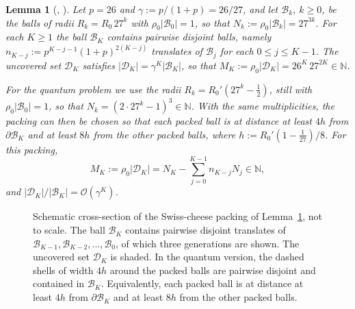 \documentclass[final,reqno]{amsart}
\newtheorem{lemma}[theorem]{Lemma}
\theoremstyle{remark}
\theoremstyle{definition}
\renewcommand{\le}{\leqslant}
\renewcommand{\ge}{\geqslant}
\newcommand{\NN}{\mathbb{N}}
\begin{document}
\begin{lemma}[{\cite[Secs.~III--IV]{lieb1972constitution}}, {\cite[Secs.~3.1 and~5.1]{lieb1975thermodynamic}}]\label{lem:LN_packing}
Let $p=26$ and $\gamma:=p/(1+p)=26/27$, and let $\mathcal B_k$, $k\ge0$, be the balls of radii $R_k=R_0\,27^k$ with $\rho_0|\mathcal B_0|=1$, so that $N_k:=\rho_0|\mathcal B_k|=27^{3k}$. For each $K\ge1$ the ball $\mathcal B_K$ contains pairwise disjoint balls, namely $n_{K-j}:=p^{K-j-1}(1+p)^{2(K-j)}$ translates of $\mathcal B_j$ for each $0\le j\le K-1$. The uncovered set $\mathcal D_K$ satisfies $|\mathcal D_K|=\gamma^K|\mathcal B_K|$, so that $M_K:=\rho_0|\mathcal D_K|=26^K\,27^{2K}\in\NN$.

For the quantum problem we use the radii $R_k=R_0'(27^k-\frac12)$, still with $\rho_0|\mathcal B_0|=1$, so that $N_k=(2\cdot27^k-1)^3\in\NN$. With the same multiplicities, the packing can then be chosen so that each packed ball is at distance at least $4h$ from $\partial \mathcal B_K$ and at least $8h$ from the other packed balls, where $h:=R_0'(1-\frac1{27})/8$. For this packing,
\[
M_K:=\rho_0|\mathcal D_K|=N_K-\sum_{j=0}^{K-1}n_{K-j}N_j\in\NN,
\]
and $|\mathcal D_K|/|\mathcal B_K|=\mathcal O(\gamma^K)$.
\end{lemma}

\begin{figure}[ht]
\centering
{}
\caption{Schematic cross-section of the Swiss-cheese packing of Lemma~\ref{lem:LN_packing}, not to scale. The ball $\mathcal B_K$ contains pairwise disjoint translates of $\mathcal B_{K-1},\mathcal B_{K-2},\dots,\mathcal B_0$, of which three generations are shown. The uncovered set $\mathcal D_K$ is shaded. In the quantum version, the dashed shells of width $4h$ around the packed balls are pairwise disjoint and contained in $\mathcal B_K$. Equivalently, each packed ball is at distance at least $4h$ from $\partial \mathcal B_K$ and at least $8h$ from the other packed balls.}
\label{fig:LN_packing}
\end{figure}
\end{document}
